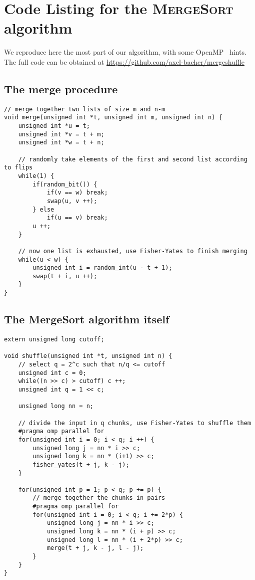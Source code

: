 \documentclass[letter,11pt,en]{quick-document}
\begin{document}



\newpage
\appendix

\section{Code Listing for the \textsc{MergeSort} algorithm}

We reproduce here the most part of our algorithm, with some
OpenMP~\cite{DaEn98, Chandra01} hints. The full code can be obtained at
\url{https://github.com/axel-bacher/mergeshuffle}

\subsection{The merge procedure}
\begin{lstlisting}
// merge together two lists of size m and n-m
void merge(unsigned int *t, unsigned int m, unsigned int n) {
    unsigned int *u = t;
    unsigned int *v = t + m;
    unsigned int *w = t + n;

    // randomly take elements of the first and second list according to flips
    while(1) {
        if(random_bit()) {
            if(v == w) break;
            swap(u, v ++);
        } else
            if(u == v) break;
        u ++;
    }

    // now one list is exhausted, use Fisher-Yates to finish merging
    while(u < w) {
        unsigned int i = random_int(u - t + 1);
        swap(t + i, u ++);
    }
}
\end{lstlisting}

\subsection{The MergeSort algorithm itself}

\begin{lstlisting}
extern unsigned long cutoff;

void shuffle(unsigned int *t, unsigned int n) {
    // select q = 2^c such that n/q <= cutoff
    unsigned int c = 0;
    while((n >> c) > cutoff) c ++;
    unsigned int q = 1 << c;

    unsigned long nn = n;

    // divide the input in q chunks, use Fisher-Yates to shuffle them
    #pragma omp parallel for
    for(unsigned int i = 0; i < q; i ++) {
        unsigned long j = nn * i >> c;
        unsigned long k = nn * (i+1) >> c;
        fisher_yates(t + j, k - j);
    }

    for(unsigned int p = 1; p < q; p += p) {
        // merge together the chunks in pairs
        #pragma omp parallel for
        for(unsigned int i = 0; i < q; i += 2*p) {
            unsigned long j = nn * i >> c;
            unsigned long k = nn * (i + p) >> c;
            unsigned long l = nn * (i + 2*p) >> c;
            merge(t + j, k - j, l - j);
        }
    }
}
\end{lstlisting}
\end{document}
